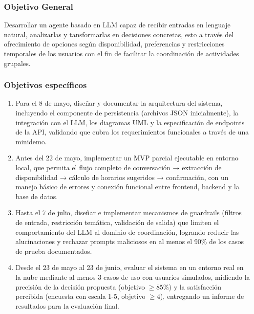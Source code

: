 \subsubsection{Objetivo General}

Desarrollar un agente basado en LLM capaz de recibir entradas en lenguaje natural, analizarlas y tansformarlas en decisiones concretas, esto a través del ofrecimiento de opciones según disponibilidad, preferencias y restricciones temporales de los usuarios con el fin de facilitar la coordinación de actividades grupales.

\subsubsection{Objetivos específicos}

\begin{enumerate}
    \item Para el 8 de mayo, diseñar y documentar la arquitectura del sistema, incluyendo el componente de persistencia (archivos JSON inicialmente), la integración con el LLM, los diagramas UML y la especificación de endpoints de la API, validando que cubra los requerimientos funcionales a través de una minidemo.
    
    \item Antes del 22 de mayo, implementar un MVP parcial ejecutable en entorno local, que permita el flujo completo de conversación → extracción de disponibilidad → cálculo de horarios sugeridos → confirmación, con un manejo básico de errores y conexión funcional entre frontend, backend y la base de datos.
    
    \item Hasta el 7 de julio, diseñar e implementar mecanismos de guardrails (filtros de entrada, restricción temática, validación de salida) que limiten el comportamiento del LLM al dominio de coordinación, logrando reducir las alucinaciones y rechazar prompts maliciosos en al menos el 90\% de los casos de prueba documentados.
    
    \item Desde el 23 de mayo al 23 de junio, evaluar el sistema en un entorno real en la nube mediante al menos 3 casos de uso con usuarios simulados, midiendo la precisión de la decisión propuesta (objetivo $\ge 85\%$) y la satisfacción percibida (encuesta con escala 1-5, objetivo $\ge 4$), entregando un informe de resultados para la evaluación final.
\end{enumerate}